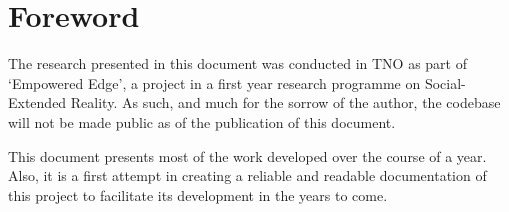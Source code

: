 \chapter*{Foreword}



The research presented in this document was conducted in TNO as part of ‘Empowered Edge’, a project in a first year research programme on Social-Extended Reality. As such, and much for the sorrow of the author, the codebase will not be made public as of the publication of this document.

This document presents most of the work developed over the course of a year. Also, it is a first attempt in creating a reliable and readable documentation of this project to facilitate its development in the years to come. 



\cleardoublepage


